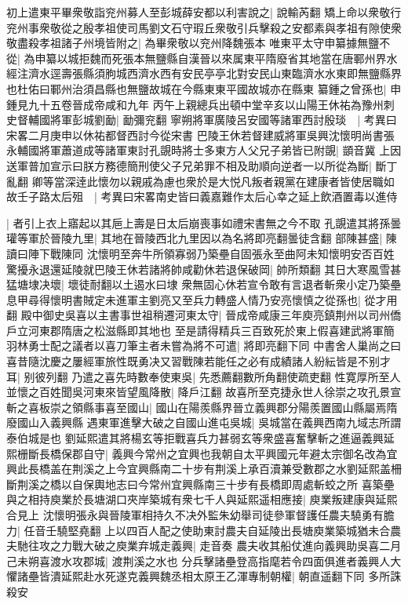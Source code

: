 初上遣東平畢衆敬詣兖州募人至彭城薛安都以利害說之|{
	說輸芮翻}
矯上命以衆敬行兖州事衆敬從之殷孝祖使司馬劉文石守瑕丘衆敬引兵擊殺之安都素與孝祖有隙使衆敬盡殺孝祖諸子州境皆附之|{
	為畢衆敬以兖州降魏張本}
唯東平太守申纂據無鹽不從|{
	為申纂以城拒魏而死張本無鹽縣自漢晉以來属東平隋廢省其地當在唐鄆州界水經注濟水逕壽張縣須朐城西濟水西有安民亭亭北對安民山東臨濟水水東即無鹽縣界也杜佑曰鄆州治須昌縣也無鹽故城在今縣東東平國故城亦在縣東}
纂鍾之曾孫也|{
	申鍾見九十五卷晉成帝咸和九年}
丙午上親總兵出頓中堂辛亥以山陽王休祐為豫州刺史督輔國將軍彭城劉勔|{
	勔彌兖翻}
寧朔將軍廣陵呂安國等諸軍西討殷琰　|{
	考異曰宋畧二月庚申以休祐都督西討今從宋書}
巴陵王休若督建威將軍吳興沈懷明尚書張永輔國將軍蕭道成等諸軍東討孔覬時將士多東方人父兄子弟皆已附覬|{
	顗音冀}
上因送軍普加宣示曰朕方務德簡刑使父子兄弟罪不相及助順向逆者一以所從為斷|{
	斷丁亂翻}
卿等當深逹此懷勿以親戚為慮也衆於是大悦凡叛者親黨在建康者皆使居職如故壬子路太后殂　|{
	考異曰宋畧南史皆曰義嘉難作太后心幸之延上飲酒置毒以進侍}


|{
	者引上衣上寤起以其巵上壽是日太后崩喪事如禮宋書無之今不取}
孔覬遣其將孫曇瓘等軍於晉陵九里|{
	其地在晉陵西北九里因以為名將即亮翻曇徒含翻}
部陳甚盛|{
	陳讀曰陣下戰陳同}
沈懷明至奔牛所領寡弱乃築壘自固張永至曲阿未知懷明安否百姓驚擾永退還延陵就巴陵王休若諸將帥咸勸休若退保破岡|{
	帥所類翻}
其日大寒風雪甚猛塘埭决壞|{
	壞徒耐翻以土遏水曰埭}
衆無固心休若宣令敢有言退者斬衆小定乃築壘息甲尋得懷明書賊定未進軍主劉亮又至兵力轉盛人情乃安亮懷慎之從孫也|{
	從才用翻}
殿中御史吳喜以主書事世祖稍遷河東太守|{
	晉成帝咸康三年庾亮鎮荆州以司州僑戶立河東郡隋唐之松滋縣即其地也}
至是請得精兵三百致死於東上假喜建武將軍簡羽林勇士配之議者以喜刀筆主者未嘗為將不可遣|{
	將即亮翻下同}
中書舍人巢尚之曰喜昔隨沈慶之屢經軍旅性既勇决又習戰陳若能任之必有成績諸人紛紜皆是不别才耳|{
	别彼列翻}
乃遣之喜先時數奉使東吳|{
	先悉薦翻數所角翻使疏吏翻}
性寛厚所至人並懷之百姓聞吳河東來皆望風降散|{
	降戶江翻}
故喜所至克捷永世人徐崇之攻孔景宣斬之喜板崇之領縣事喜至國山|{
	國山在陽羨縣界晉立義興郡分陽羨置國山縣屬焉隋廢國山入義興縣}
遇東軍進擊大破之自國山進屯吳城|{
	吳城當在義興西南九域志所謂泰伯城是也}
劉延熙遣其將楊玄等拒戰喜兵力甚弱玄等衆盛喜奮擊斬之進逼義興延熙栅斷長橋保郡自守|{
	義興今常州之宜興也我朝自太平興國元年避太宗御名改為宜興此長橋盖在荆溪之上今宜興縣南二十步有荆溪上承百瀆兼受數郡之水劉延熙盖柵斷荆溪之橋以自保輿地志曰今常州宜興縣南三十步有長橋即周處斬蛟之所}
喜築壘與之相持庾業於長塘湖口夾岸築城有衆七千人與延熙遥相應接|{
	庾業叛建康與延熙合見上}
沈懷明張永與晉陵軍相持久不决外監朱幼舉司徒參軍督護任農夫驍勇有膽力|{
	任音壬驍堅堯翻}
上以四百人配之使助東討農夫自延陵出長塘庾業築城猶未合農夫馳往攻之力戰大破之庾業弃城走義興|{
	走音奏}
農夫收其船仗進向義興助吳喜二月己未朔喜渡水攻郡城|{
	渡荆溪之水也}
分兵擊諸壘登高指麾若令四面俱進者義興人大懼諸壘皆潰延熙赴水死遂克義興魏丞相太原王乙渾專制朝權|{
	朝直遥翻下同}
多所誅殺安

